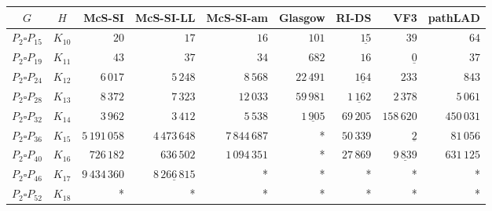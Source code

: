 
\begin{tabular}{ccrrrrrrr}
    \toprule
    {$G$} & {$H$} & {McS-SI} & {McS-SI-LL} & {McS-SI-am} & Glasgow & RI-DS & VF3 & pathLAD \\ 
    \midrule

$P_2\square P_{15}$ & $K_{10}$ & $20$ & $17$ & $16$ & $101$ & $\underline{15}$ & $39$ & $64$\\
$P_2\square P_{19}$ & $K_{11}$ & $43$ & $37$ & $34$ & $682$ & $16$ & $\underline{0}$ & $37$\\
$P_2\square P_{24}$ & $K_{12}$ & $6\,017$ & $5\,248$ & $8\,568$ & $22\,491$ & $\underline{164}$ & $233$ & $843$\\
$P_2\square P_{28}$ & $K_{13}$ & $8\,372$ & $7\,323$ & $12\,033$ & $59\,981$ & $\underline{1\,162}$ & $2\,378$ & $5\,061$\\
$P_2\square P_{32}$ & $K_{14}$ & $3\,962$ & $3\,412$ & $5\,538$ & $\underline{1\,905}$ & $69\,205$ & $158\,620$ & $450\,031$\\
$P_2\square P_{36}$ & $K_{15}$ & $5\,191\,058$ & $4\,473\,648$ & $7\,844\,687$ & * & $50\,339$ & $\underline{2}$ & $81\,056$\\
$P_2\square P_{40}$ & $K_{16}$ & $726\,182$ & $636\,502$ & $1\,094\,351$ & * & $27\,869$ & $\underline{9\,839}$ & $631\,125$\\
$P_2\square P_{46}$ & $K_{17}$ & $9\,434\,360$ & $\underline{8\,266\,815}$ & * & * & * & * & *\\
$P_2\square P_{52}$ & $K_{18}$ & * & * & * & * & * & * & *\\

    \bottomrule
\end{tabular}

